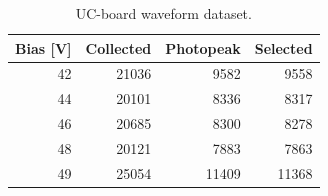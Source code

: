 \begin{table}[htbp]
\centering
\small
\begin{tabular}{rrrr}
\toprule
Bias [V] & Collected & Photopeak & Selected \\
\midrule
42 & 21036 & 9582 & 9558 \\
44 & 20101 & 8336 & 8317 \\
46 & 20685 & 8300 & 8278 \\
48 & 20121 & 7883 & 7863 \\
49 & 25054 & 11409 & 11368 \\
\bottomrule
\end{tabular}
\caption{UC-board waveform dataset.}
\label{tab:uc-board-dataset}
\end{table}
